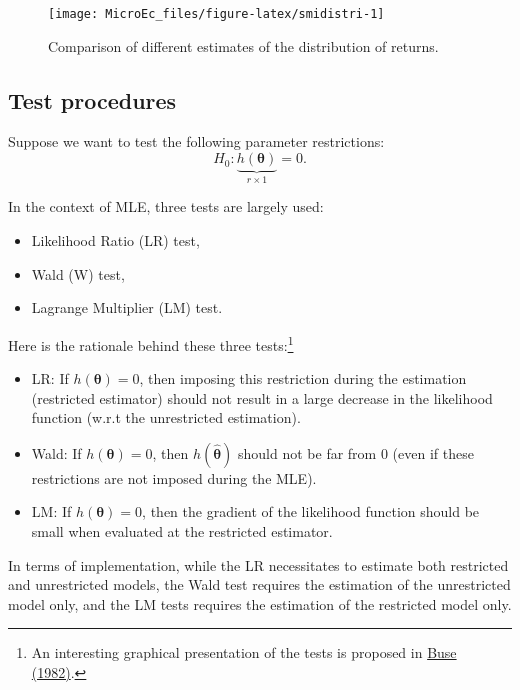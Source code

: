 \documentclass[
  12pt,
]{book}
\providecommand{\tightlist}{%
  \setlength{\itemsep}{0pt}\setlength{\parskip}{0pt}}
\theoremstyle{definition}
\theoremstyle{definition}
\theoremstyle{definition}
\theoremstyle{definition}
\theoremstyle{remark}
\begin{document}
\begin{figure}
\texttt{[image: MicroEc\_files/figure-latex/smidistri-1]} \caption{Comparison of different estimates of the distribution of returns.}\label{fig:smidistri}
\end{figure}

\hypertarget{TestMLE}{%
\subsection{Test procedures}\label{TestMLE}}

Suppose we want to test the following parameter restrictions:
\begin{equation}
\boxed{H_0: \underbrace{h(\boldsymbol\theta)}_{r \times 1}=0.}
\end{equation}

In the context of MLE, three tests are largely used:

\begin{itemize}
\tightlist
\item
  Likelihood Ratio (LR) test,
\item
  Wald (W) test,
\item
  Lagrange Multiplier (LM) test.
\end{itemize}

Here is the rationale behind these three tests:\footnote{An interesting graphical presentation of the tests is proposed in \href{http://hedibert.org/wp-content/uploads/2014/04/LR-W-LM-Tests-Buse1982.pdf}{Buse (1982)}.}

\begin{itemize}
\tightlist
\item
  LR: If \(h(\boldsymbol\theta)=0\), then imposing this restriction during the estimation (restricted estimator) should not result in a large decrease in the likelihood function (w.r.t the unrestricted estimation).
\item
  Wald: If \(h(\boldsymbol\theta)=0\), then \(h(\hat{\boldsymbol\theta})\) should not be far from \(0\) (even if these restrictions are not imposed during the MLE).
\item
  LM: If \(h(\boldsymbol\theta)=0\), then the gradient of the likelihood function should be small when evaluated at the restricted estimator.
\end{itemize}

In terms of implementation, while the LR necessitates to estimate both restricted and unrestricted models, the Wald test requires the estimation of the unrestricted model only, and the LM tests requires the estimation of the restricted model only.
\end{document}
